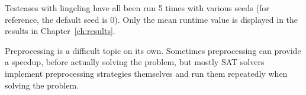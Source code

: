 Testcases with lingeling have all been run 5 times with various seeds (for reference, the default seed is 0).
Only the mean runtime value is displayed in the results in Chapter~\ref{ch:results}.

Preprocessing is a difficult topic on its own. Sometimes preprocessing can provide a speedup,
before actually solving the problem, but mostly SAT solvers implement preprocessing strategies
themselves and run them repeatedly when solving the problem.
